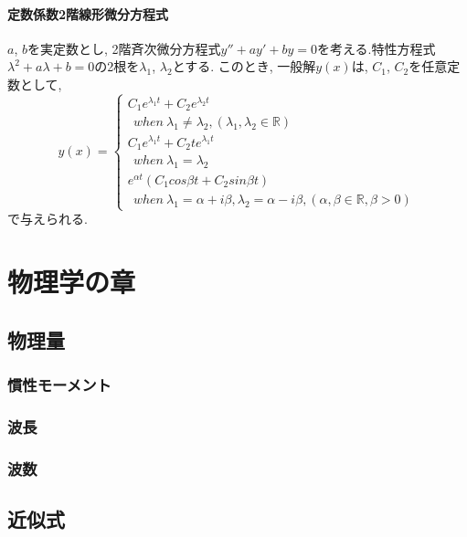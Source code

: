 \documentclass[]{jreport}
\begin{document}
\subsection{定数係数2階線形微分方程式}
$a$, $b$を実定数とし, 2階斉次微分方程式$y''+ay'+by=0$を考える.特性方程式$\lambda^2+a\lambda+b=0$の2根を$\lambda_{1}$, $\lambda_{2}$とする. このとき, 一般解$y(x)$は, $C_{1}$, $C_{2}$を任意定数として, \\
\begin{equation}
    y(x)= \left \{
        \begin{array}{l}
            C_{1}e^{\lambda_{1} t}+C_{2}e^{\lambda_{2} t}\\
            \ \ when \ \lambda_{1}\neq\lambda_{2}, (\lambda_{1}, \lambda_{2}\in\mathbb{R}) \\
            C_{1}e^{\lambda_{1} t}+C_{2}te^{\lambda_{1} t}\\
            \ \ when \ \lambda_{1}=\lambda_{2} \\
            e^{\alpha t}(C_{1}cos{\beta t}+C_{2}sin{\beta t}) \\
            \ \ when \ \lambda_{1}=\alpha+{i\beta}, \lambda_{2}=\alpha-{i\beta}, (\alpha, \beta\in\mathbb{R}, \beta>0)
        \end{array}
    \right.
\end{equation}
で与えられる.

\part{物理学の章}
\chapter{物理量}
\section{慣性モーメント}
\section{波長}

\section{波数}

\chapter{近似式}
\end{document}
